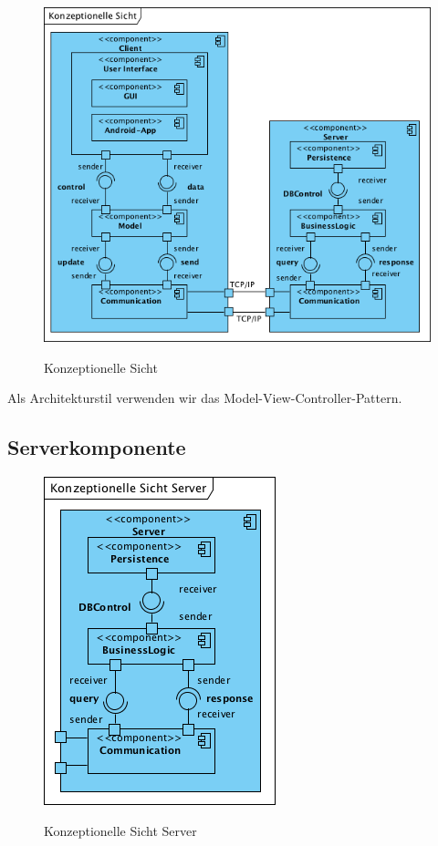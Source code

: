 \documentclass[fontsize=12pt,paper=a4,twoside]{scrartcl}
\begin{document}
\begin{figure} [H] 
\caption{Konzeptionelle Sicht}  \centering
	\includegraphics[width=1\textwidth]{Diagramme/KonzeptionelleSicht.png} 
	\label{pic:konzeptionellesicht} 
\end{figure}

{\centering Als Architekturstil verwenden wir das Model-View-Controller-Pattern.\\}

\subsection{Serverkomponente}
\label{sec:server}

\begin{figure} [H] 
\caption{Konzeptionelle Sicht Server}  \centering
	\includegraphics[scale=1.85]{Diagramme/KonzeptionelleSichtServer.png} 
	\label{pic:konzeptionellesichtserver} 
\end{figure}
\end{document}
